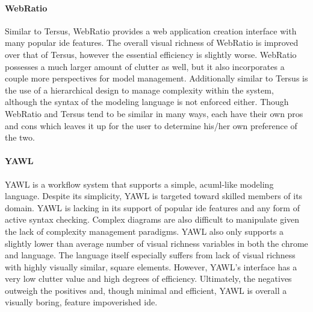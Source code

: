 \paragraph{WebRatio} Similar to Tersus, WebRatio provides a web application
creation interface with many popular \ac{ide} features. The overall visual
richness of WebRatio is improved over that of Tersus, however the essential
efficiency is slightly worse.  WebRatio possesses a much larger amount of
clutter as well, but it also incorporates a couple more perspectives for
model management. Additionally similar to Tersus is the use of a
hierarchical design to manage complexity within the system, although the
syntax of the modeling language is not enforced either. Though WebRatio and
Tersus tend to be similar in many ways, each have their own pros and cons
which leaves it up for the user to determine his/her own preference of the
two.

\paragraph{YAWL} YAWL is a workflow system that supports a simple,
ac{uml}-like modeling language. Despite its simplicity, YAWL is targeted
toward skilled members of its domain. YAWL is lacking in its support of
popular \ac{ide} features and any form of active syntax checking. Complex
diagrams are also difficult to manipulate given the lack of complexity
management paradigms.  YAWL also only supports a slightly lower than
average number of visual richness variables in both the chrome and
language. The language itself especially suffers from lack of visual
richness with highly visually similar, square elements. However, YAWL's
interface has a very low clutter value and high degrees of efficiency.
Ultimately, the negatives outweigh the positives and, though minimal and
efficient, YAWL is overall a visually boring, feature impoverished
\ac{ide}.

